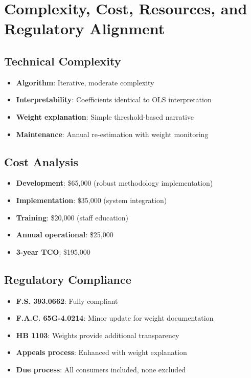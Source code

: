\section{Complexity, Cost, Resources, and Regulatory Alignment}

\subsection{Technical Complexity}

\begin{itemize}
    \item \textbf{Algorithm}: Iterative, moderate complexity
    \item \textbf{Interpretability}: Coefficients identical to OLS interpretation
    \item \textbf{Weight explanation}: Simple threshold-based narrative
    \item \textbf{Maintenance}: Annual re-estimation with weight monitoring
\end{itemize}

\subsection{Cost Analysis}

\begin{itemize}
    \item \textbf{Development}: \$65,000 (robust methodology implementation)
    \item \textbf{Implementation}: \$35,000 (system integration)
    \item \textbf{Training}: \$20,000 (staff education)
    \item \textbf{Annual operational}: \$25,000
    \item \textbf{3-year TCO}: \$195,000
\end{itemize}

\subsection{Regulatory Compliance}

\begin{itemize}
    \item \textbf{F.S. 393.0662}: Fully compliant
    \item \textbf{F.A.C. 65G-4.0214}: Minor update for weight documentation
    \item \textbf{HB 1103}: Weights provide additional transparency
    \item \textbf{Appeals process}: Enhanced with weight explanation
    \item \textbf{Due process}: All consumers included, none excluded
\end{itemize}

